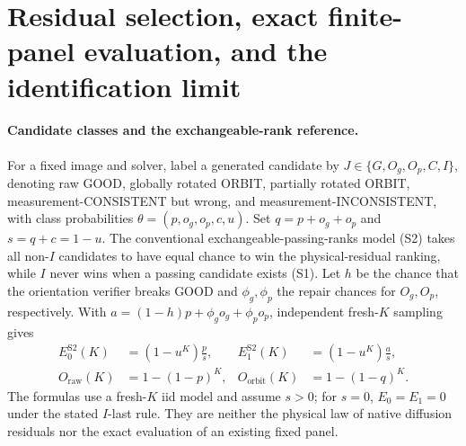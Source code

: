 \section{Residual selection, exact finite-panel evaluation, and the identification limit}
\label{sec:suppl-selection}

\paragraph{Candidate classes and the exchangeable-rank reference.}
For a fixed image and solver, label a generated candidate by
$J\in\{G,O_g,O_p,C,I\}$, denoting raw GOOD, globally rotated
ORBIT, partially rotated ORBIT, measurement-CONSISTENT but wrong,
and measurement-INCONSISTENT, with class probabilities
$\theta=(p,o_g,o_p,c,u)$.
Set $q=p+o_g+o_p$ and $s=q+c=1-u$.
The conventional exchangeable-passing-ranks model (S2) takes all
non-$I$ candidates to have equal chance to win the physical-residual
ranking, while $I$ never wins when a passing candidate exists (S1).
Let $h$ be the chance that the orientation verifier breaks GOOD and
$\phi_g,\phi_p$ the repair chances for $O_g,O_p$, respectively. With
$a=(1-h)p+\phi_go_g+\phi_po_p$, independent fresh-$K$ sampling gives
\begin{align}
 E_0^{\mathrm{S2}}(K)&=(1-u^K)\frac{p}{s}, &
 E_1^{\mathrm{S2}}(K)&=(1-u^K)\frac{a}{s},\label{eq:suppl-S3-S2}\\
 O_{\mathrm{raw}}(K)&=1-(1-p)^K, &
 O_{\mathrm{orbit}}(K)&=1-(1-q)^K.\label{eq:suppl-S3-oracle}
\end{align}
The formulas use a fresh-$K$ iid model and assume $s>0$;
for $s=0$, $E_0=E_1=0$ under the stated $I$-last rule.
They are neither the physical law of native diffusion residuals nor
the exact evaluation of an existing fixed panel.

